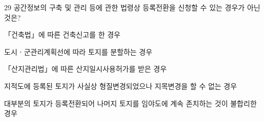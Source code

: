 \begin{question}{29}
공간정보의 구축 및 관리 등에 관한 법령상 등록전환을 신청할 수 있는 경우가 아닌 것은?
\begin{choices}
  \item 「건축법」에 따른 건축신고를 한 경우
  \item 도시ㆍ군관리계획선에 따라 토지를 분할하는 경우
  \item 「산지관리법」에 따른 산지일시사용허가를 받은 경우
  \item 지적도에 등록된 토지가 사실상 형질변경되었으나 지목변경을 할 수 없는 경우
  \item 대부분의 토지가 등록전환되어 나머지 토지를 임야도에 계속 존치하는 것이 불합리한 경우
\end{choices}
\end{question}
